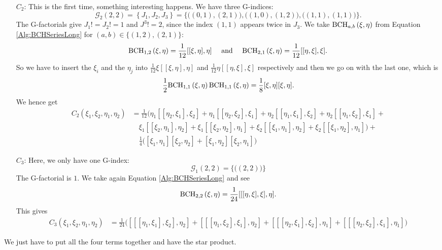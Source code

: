 \begin{itemize}
	\item[$C_2$:]
	This is the first time, something interesting happens. We have three 
	G-indices:
	\begin{equation*}
		\mathcal{G}_2(2,2) 
		=
		\left\{ J_1, J_2, J_3 \right\}
		= 
		\big\{ 
			\big((0,1), (2,1)\big), 
			\big((1,0), (1,2)\big), 
			\big((1,1), (1,1)\big) 
		\big\}.
	\end{equation*}
	The G-factorials give $J_1! = J_2! = 1$ and $J^3! = 2$, since the index 
	$(1,1)$ appears twice in $J_3$. We take $\mathrm{BCH}_{a, b}\left(\xi, \eta\right)$ 
	from Equation \eqref{Alg:BCHSeriesLong} for $(a,b) \in \{(1,2), (2,1)\}$:
	\begin{equation*}
		\mathrm{BCH}_{1, 2}\left(\xi, \eta\right)
		=
		\frac{1}{12}[[\xi, \eta], \eta]
		\quad \text{ and } \quad
		\mathrm{BCH}_{2, 1}\left(\xi, \eta\right)
		=
		\frac{1}{12}[[\eta, \xi], \xi].
	\end{equation*}
	So we have to insert the $\xi_i$ and the $\eta_j$ into $\frac{1}{12} 
	\xi [[\xi, \eta], \eta]$ and $\frac{1}{12} \eta [[\eta, \xi], \xi]$ 
	respectively and then we go on with the last one, which is
	\begin{equation*}
		\frac{1}{2}
		\mathrm{BCH}_{1, 1}\left(\xi, \eta\right)
		\mathrm{BCH}_{1, 1}\left(\xi, \eta\right)
		=
		\frac{1}{8}
		[\xi, \eta][\xi, \eta].
	\end{equation*}
	We hence get
	\begin{align*}
		C_2(\xi_1, \xi_2, \eta_1, \eta_2) 
		& = 
		\frac{1}{12}
		\big( 
			\eta_1 [[\eta_2, \xi_1],\xi_2] + 
			\eta_1 [[\eta_2, \xi_2],\xi_1] + 
			\eta_2 [[\eta_1, \xi_1],\xi_2] + 
			\eta_2 [[\eta_1, \xi_2],\xi_1] +
		\\
		& \quad
			\xi_1 [[\xi_2, \eta_1],\eta_2] + 
			\xi_1 [[\xi_2, \eta_2],\eta_1] + 
			\xi_2 [[\xi_1, \eta_1],\eta_2] + 
			\xi_2 [[\xi_1, \eta_2],\eta_1] 
 		\big) +
 		\\
 		& \quad
		\frac{1}{4} 
		\big( 
			[\xi_1,\eta_1][\xi_2,\eta_2] + 
			[\xi_1,\eta_2][\xi_2,\eta_1] 
		\big)
	\end{align*}
	
	\item[$C_3$:]
	Here, we only have one G-index:
	\begin{equation*}
		\mathcal{G}_1(2,2) 
		=
		\big\{ 
			\big( (2,2) \big) 
		\big\}
	\end{equation*}
	The G-factorial is $1$. We take again Equation \eqref{Alg:BCHSeriesLong} 
	and see
	\begin{equation*}
		\mathrm{BCH}_{2, 2}\left(\xi, \eta\right)
		=
		\frac{1}{24}
		[[[\eta, \xi], \xi], \eta].
	\end{equation*}
	This gives
	\begin{align*}
		C_3(\xi_1, \xi_2, \eta_1, \eta_2) 
		& = 
		\frac{1}{24}
		\big( 
			[[[\eta_1,\xi_1],\xi_2],\eta_2] + 
			[[[\eta_1,\xi_2],\xi_1],\eta_2] +
			[[[\eta_2,\xi_1],\xi_2],\eta_1] + 
			[[[\eta_2,\xi_2],\xi_1],\eta_1] 
		\big)
	\end{align*}
\end{itemize}
We just have to put all the four terms together and have the star product.


